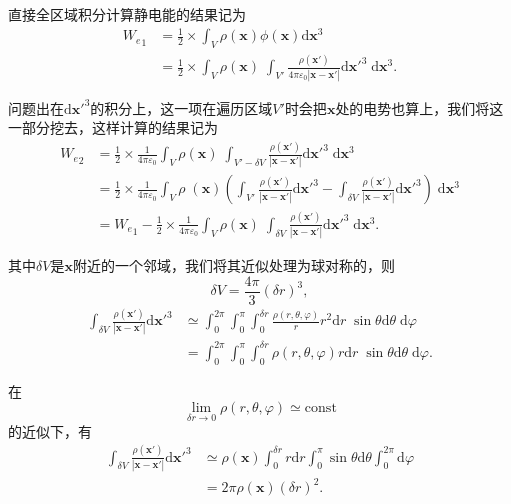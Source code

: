 \documentclass[12pt]{article}
\newcommand{\de}[1]{\mathrm{d}#1}
\newcommand{\mrm}[1]{\mathrm{#1}}
\newcommand{\mbf}[1]{\mathbf{#1}}
\newcommand{\kh}[1]{\left(#1\right)}
\begin{document}
直接全区域积分计算静电能的结果记为
\begin{align*}
    {W_e}_1 &=\frac{1}{2}\times\int_V \rho \kh{\mbf x} \phi \kh{\mbf x} \de \mbf x^3\\
    &=\frac{1}{2}\times \int_V \rho \kh{\mbf x} \; \int_{V'} \frac{\rho \kh{\mbf x'}}{4\pi \varepsilon_0|\mbf x - \mbf x'|} \de {\mbf x'}^3\; \de {\mbf x^3}.
\end{align*}

问题出在\(\de {\mbf x'}^3\)的积分上，这一项在遍历区域\(V'\)时会把\(\mbf x\)处的电势也算上，我们将这一部分挖去，这样计算的结果记为
\begin{align*}
    {W_e}_2 &=\frac{1}{2}\times \frac{1}{4\pi \varepsilon_0}\int_V \rho \kh{\mbf x} \; \int_{V'-\delta V}\frac{\rho \kh{\mbf x'}}{|\mbf x - \mbf x'|} \de {\mbf x'}^3 \; \de \mbf x^3\\
    &= \frac{1}{2}\times\frac{1}{4\pi \varepsilon_0}\int_V \rho \; \kh{\mbf x} \kh{\int_{V'}\frac{\rho \kh{\mbf x'}}{|\mbf x - \mbf x'|} \de {\mbf x'}^3-\int_{\delta V} \frac{\rho \kh{\mbf x'}}{|\mbf x - \mbf x'|} \de {\mbf x'}^3} \; \de \mbf x^3\\
    &= {W_e}_1 - \frac{1}{2}\times\frac{1}{4\pi \varepsilon_0}\int_V \rho \kh{\mbf x} \; \int_{\delta V}\frac{\rho \kh{\mbf x'}}{|\mbf x - \mbf x'|} \de {\mbf x'}^3 \; \de \mbf x^3.
\end{align*}

其中\(\delta V\)是\(\mbf x\)附近的一个邻域，我们将其近似处理为球对称的，则
\[\delta V = \frac{4\pi}{3}\kh{\delta r}^3,\]
\begin{align*}
    \int_{\delta V}\frac{\rho \kh{\mbf x'}}{|\mbf x - \mbf x'|} \de {\mbf x'}^3 &\simeq \int^{2\pi}_0 \int_0^{\pi} \int_{0}^{\delta r}\frac{\rho \kh{r,\theta,\varphi}}{r}r^2 \de r \; \sin\theta\de \theta \; \de \varphi\\
    &= \int^{2\pi}_0 \int_0^{\pi} \int_{0}^{\delta r}\rho \kh{r,\theta,\varphi}r \de r \; \sin\theta\de \theta \; \de  \varphi.
\end{align*}

在
\[\lim_{\delta r \to0}\rho\kh{r,\theta,\varphi}\simeq \mrm{const}\]
的近似下，有
\begin{align*}
    \int_{\delta V}\frac{\rho \kh{\mbf x'}}{|\mbf x - \mbf x'|} \de {\mbf x'}^3 &\simeq \rho\kh{\mbf x} \int_{0}^{\delta r}r \de r  \int_0^{\pi} \sin\theta\de \theta  \int^{2\pi}_0 \de  \varphi\\
    &= 2\pi \rho\kh{\mbf x}\kh{\delta r}^2.
\end{align*}
\end{document}
